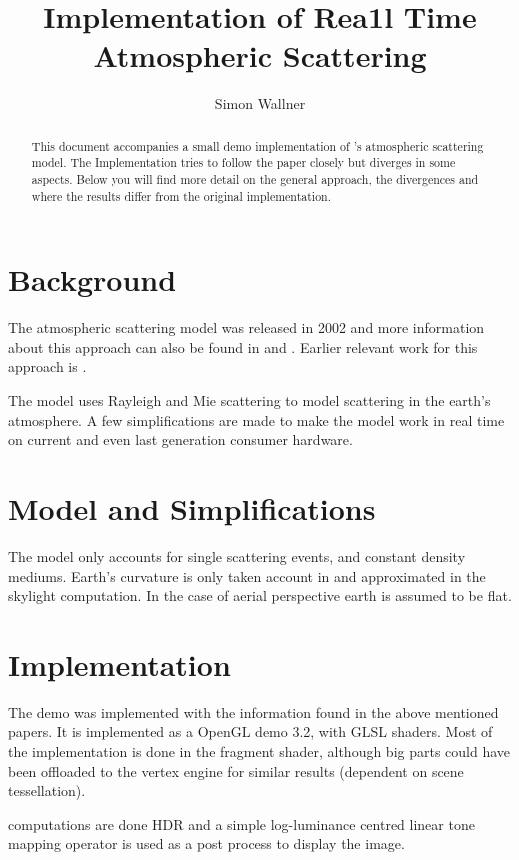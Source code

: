 \documentclass[12pt,a4paper]{scrartcl}
\author{Simon Wallner}
\title{Implementation of Rea1l Time Atmospheric Scattering}
\begin{document}
\maketitle


\begin{abstract}
This document accompanies a small demo implementation of \cite{HoffmanPreetham02Rendering-outdoor}'s atmospheric scattering model. The Implementation tries to follow the paper closely but diverges in some aspects. Below you will find more detail on the general approach, the divergences and where the results differ from the original implementation.
\end{abstract}


\section{Background}
The atmospheric scattering model \cite{HoffmanPreetham02Rendering-outdoor} was released in 2002 and more information about this approach can also be found in \cite{03ATI-LightScattering} and \cite{Preetham03Modeling-skylight}. Earlier relevant work for this approach is \cite{PreethamShirleySmits99A-practical-analytic}.

The model uses Rayleigh and Mie scattering to model scattering in the earth's atmosphere. A few simplifications are made to make the model work in real time on current and even last generation consumer hardware.


\section{Model and Simplifications}
The model only accounts for single scattering events, and constant density mediums. Earth's curvature is only taken account in and approximated in the skylight computation. In the case of aerial perspective earth is assumed to be flat.

\section{Implementation}
The demo was implemented with the information found in the above mentioned papers. It is implemented as a OpenGL demo 3.2, with GLSL shaders. Most of the implementation is done in the fragment shader, although big parts could have been offloaded to the vertex engine for similar results (dependent on scene tessellation).

computations are done HDR and a simple log-luminance centred linear tone mapping operator is used as a post process to display the image.
\end{document}
